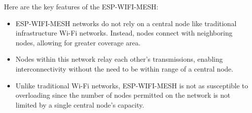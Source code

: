 Here are the key features of the ESP-WIFI-MESH:
\begin{itemize}
    \item ESP-WIFI-MESH networks do not rely on a central node like traditional infrastructure Wi-Fi networks. Instead, nodes connect with neighboring nodes, allowing for greater coverage area.
    \item Nodes within this network relay each other's transmissions, enabling interconnectivity without the need to be within range of a central node.
    \item Unlike traditional Wi-Fi networks, ESP-WIFI-MESH is not as susceptible to overloading since the number of nodes permitted on the network is not limited by a single central node's capacity.
\end{itemize}